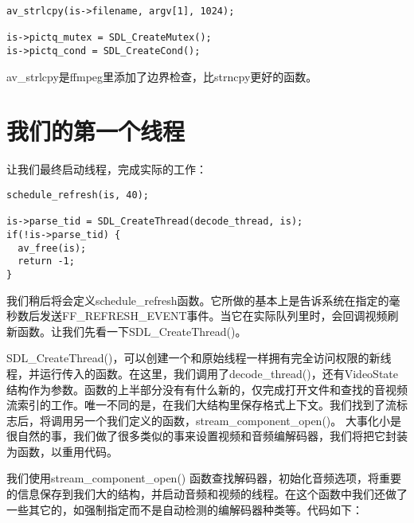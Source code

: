 \begin{lstlisting}
av_strlcpy(is->filename, argv[1], 1024);

is->pictq_mutex = SDL_CreateMutex();
is->pictq_cond = SDL_CreateCond();
\end{lstlisting}

av_strlcpy是ffmpeg里添加了边界检查，比strncpy更好的函数。

\section{我们的第一个线程 }

让我们最终启动线程，完成实际的工作：
\begin{lstlisting}
schedule_refresh(is, 40);

is->parse_tid = SDL_CreateThread(decode_thread, is);
if(!is->parse_tid) {
  av_free(is);
  return -1;
}
\end{lstlisting}

我们稍后将会定义schedule_refresh函数。它所做的基本上是告诉系统在指定的毫秒数后发送FF_REFRESH_EVENT事件。当它在实际队列里时，会回调视频刷新函数。让我们先看一下SDL_CreateThread()。

SDL_CreateThread()，可以创建一个和原始线程一样拥有完全访问权限的新线程，并运行传入的函数。在这里，我们调用了decode_thread()，还有VideoState结构作为参数。函数的上半部分没有有什么新的，仅完成打开文件和查找的音视频流索引的工作。唯一不同的是，在我们大结构里保存格式上下文。我们找到了流标志后，将调用另一个我们定义的函数，stream_component_open()。 大事化小是很自然的事，我们做了很多类似的事来设置视频和音频编解码器，我们将把它封装为函数，以重用代码。

我们使用stream_component_open() 函数查找解码器，初始化音频选项，将重要的信息保存到我们大的结构，并启动音频和视频的线程。在这个函数中我们还做了一些其它的，如强制指定而不是自动检测的编解码器种类等。代码如下：

